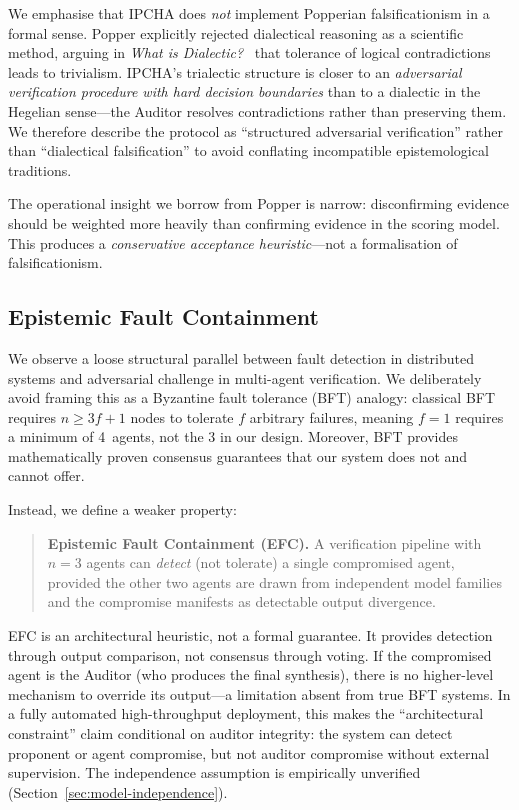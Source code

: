 \documentclass[11pt,a4paper]{article}
\begin{document}
We emphasise that IPCHA does \emph{not} implement Popperian
falsificationism in a formal sense.  Popper explicitly rejected
dialectical reasoning as a scientific method, arguing in
\emph{What is Dialectic?}~\cite{popper1940dialectic} that
tolerance of logical contradictions leads to trivialism.  IPCHA's trialectic structure is
closer to an \emph{adversarial verification procedure with hard
decision boundaries} than to a dialectic in the Hegelian sense---the
Auditor resolves contradictions rather than preserving them.  We
therefore describe the protocol as ``structured adversarial
verification'' rather than ``dialectical falsification'' to avoid
conflating incompatible epistemological traditions.

The operational insight we borrow from Popper is narrow:
disconfirming evidence should be weighted more heavily than confirming
evidence in the scoring model.  This produces a \emph{conservative
acceptance heuristic}---not a formalisation of falsificationism.

\subsection{Epistemic Fault Containment}\label{sec:efc}

We observe a loose structural parallel between fault detection in
distributed systems and adversarial challenge in multi-agent
verification.  We deliberately avoid framing this as a Byzantine
fault tolerance (BFT) analogy: classical BFT~\cite{lamport1982byzantine}
requires $n \geq 3f+1$ nodes to tolerate $f$ arbitrary failures,
meaning $f=1$ requires a minimum of 4~agents, not the 3 in our
design.  Moreover, BFT provides mathematically proven consensus
guarantees that our system does not and cannot offer.

Instead, we define a weaker property:

\begin{quote}
\textbf{Epistemic Fault Containment (EFC).}
A verification pipeline with $n=3$ agents can \emph{detect} (not
tolerate) a single compromised agent, provided the other two agents
are drawn from independent model families and the compromise
manifests as detectable output divergence.
\end{quote}

EFC is an architectural heuristic, not a formal guarantee.  It
provides detection through output comparison, not consensus through
voting.  If the compromised agent is the Auditor (who produces the
final synthesis), there is no higher-level mechanism to override its
output---a limitation absent from true BFT systems.  In a fully
automated high-throughput deployment, this makes the ``architectural
constraint'' claim conditional on auditor integrity: the system can
detect proponent or agent compromise, but not auditor compromise
without external supervision.  The independence assumption is
empirically unverified (Section~\ref{sec:model-independence}).
\end{document}
